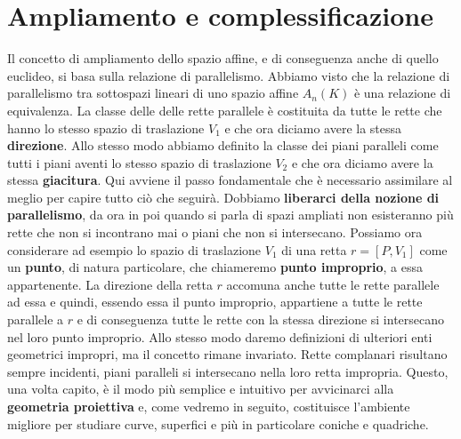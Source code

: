 \chapter{Ampliamento e complessificazione}
Il concetto di ampliamento dello spazio affine, e di conseguenza anche di quello euclideo, si basa sulla relazione di parallelismo. Abbiamo visto che la relazione di parallelismo tra sottospazi lineari di uno spazio affine \(A_n(K)\) è una relazione di equivalenza. La classe delle delle rette parallele è costituita da tutte le rette che hanno lo stesso spazio di traslazione \(V_1\) e che ora diciamo avere la stessa \textbf{direzione}. Allo stesso modo abbiamo definito la classe dei piani paralleli come tutti i piani aventi lo stesso spazio di traslazione \(V_2\) e che ora diciamo avere la stessa \textbf{giacitura}. Qui avviene il passo fondamentale che è necessario assimilare al meglio per capire tutto ciò che seguirà. Dobbiamo \textbf{liberarci della nozione di parallelismo}, da ora in poi quando si parla di spazi ampliati non esisteranno più rette che non si incontrano mai o piani che non si intersecano. Possiamo ora considerare ad esempio lo spazio di traslazione \(V_1\) di una retta \(r = [P, V_1]\) come un \textbf{punto}, di natura particolare, che chiameremo \textbf{punto improprio}, a essa appartenente. La direzione della retta \(r\) accomuna anche tutte le rette parallele ad essa e quindi, essendo essa il punto improprio, appartiene a tutte le rette parallele a \(r\) e di conseguenza tutte le rette con la stessa direzione si intersecano nel loro punto improprio. Allo stesso modo daremo definizioni di ulteriori enti geometrici impropri, ma il concetto rimane invariato. Rette complanari risultano sempre incidenti, piani paralleli si intersecano nella loro retta impropria. Questo, una volta capito, è il modo più semplice e intuitivo per avvicinarci alla \textbf{geometria proiettiva} e, come vedremo in seguito, costituisce l'ambiente migliore per studiare curve, superfici e più in particolare coniche e quadriche.

